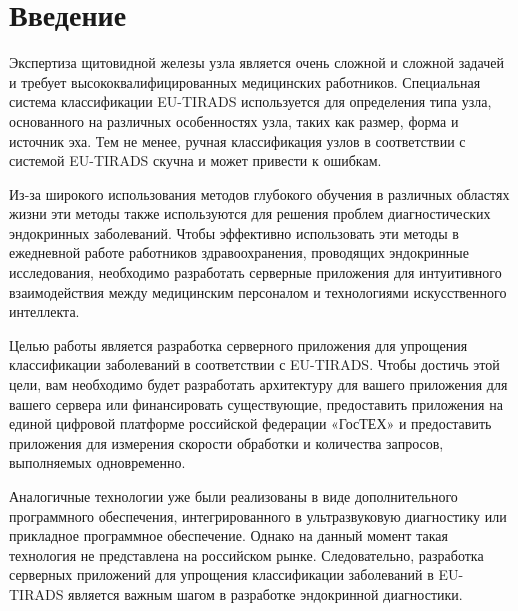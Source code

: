 \chapter*{Введение}
\label{sec:afterwords}

Экспертиза щитовидной железы узла является очень сложной и сложной задачей и требует высококвалифицированных медицинских работников. Специальная система классификации EU-TIRADS используется для определения типа узла, основанного на различных особенностях узла, таких как размер, форма и источник эха. Тем не менее, ручная классификация узлов в соответствии с системой EU-TIRADS скучна и может привести к ошибкам.


Из-за широкого использования методов глубокого обучения в различных областях жизни эти методы также используются для решения проблем диагностических эндокринных заболеваний. Чтобы эффективно использовать эти методы в ежедневной работе работников здравоохранения, проводящих эндокринные исследования, необходимо разработать серверные приложения для интуитивного взаимодействия между медицинским персоналом и технологиями искусственного интеллекта.


Целью работы является разработка серверного приложения для упрощения классификации заболеваний в соответствии с EU-TIRADS. Чтобы достичь этой цели, вам необходимо будет разработать архитектуру для вашего приложения для вашего сервера или финансировать существующие, предоставить приложения на единой цифровой платформе российской федерации «ГосТЕХ» и предоставить приложения для измерения скорости обработки и количества запросов, выполняемых одновременно.


Аналогичные технологии уже были реализованы в виде дополнительного программного обеспечения, интегрированного в ультразвуковую диагностику или прикладное программное обеспечение. Однако на данный момент такая технология не представлена ​​на российском рынке. Следовательно, разработка серверных приложений для упрощения классификации заболеваний в EU-TIRADS является важным шагом в разработке эндокринной диагностики.

